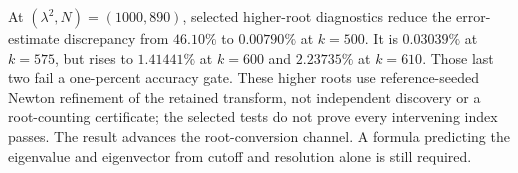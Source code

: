 At $(\lambda^2,N)=(1000,890)$, selected higher-root diagnostics reduce
the error-estimate discrepancy from $46.10\%$ to $0.00790\%$ at $k=500$.
It is $0.03039\%$ at $k=575$, but rises to $1.41441\%$ at $k=600$ and
$2.23735\%$ at $k=610$. Those last two fail a one-percent accuracy gate.
These higher roots use reference-seeded Newton refinement of the retained
transform, not independent discovery or a root-counting certificate; the
selected tests do not prove every intervening index passes. The result
advances the root-conversion channel. A formula predicting the eigenvalue
and eigenvector from cutoff and resolution alone is still required.
